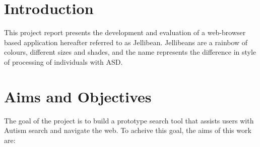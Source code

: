 \documentclass[a4paper, 11pt]{article}
\begin{document}
\section{Introduction}\label{intro}

This project report presents the development and evaluation of a web-browser based application hereafter referred to as Jellibean. Jellibeans are a rainbow of colours, different sizes and shades, and the name represents the difference in style of processing of individuals with ASD. 

\section{}

\section {Aims and Objectives}
The goal of the project is to build a prototype search tool that assists users with Autism search and navigate the web. To acheive this goal, the aims of this work are:
\end{document}
